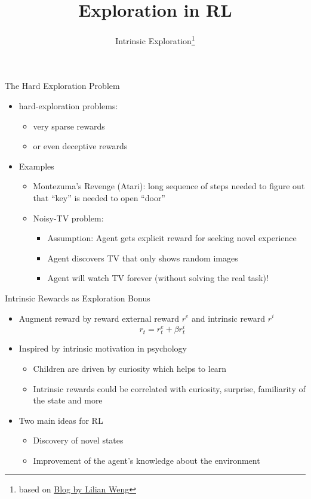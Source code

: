 \documentclass[aspectratio=169]{../latex_main/tntbeamer}  %
\title[RL: Exploration]{Exploration in RL}
\subtitle{Intrinsic Exploration\footnote{based on \href{https://lilianweng.github.io/lil-log/2020/06/07/exploration-strategies-in-deep-reinforcement-learning.html}{Blog by Lilian Weng}}}
\begin{document}
	
	\maketitle

\begin{frame}[c]{The Hard Exploration Problem}
	
	\begin{itemize}
		\item hard-exploration problems:
		\begin{itemize}
			\item very sparse rewards 
			\item or even deceptive rewards
		\end{itemize}
		\medskip
		\pause
		\item Examples
		\begin{itemize}
			\item Montezuma's Revenge (Atari): long sequence of steps needed to figure out that ``key'' is needed to open ``door''
			\item Noisy-TV problem: 
			\begin{itemize}
				\item Assumption: Agent gets explicit reward for seeking novel experience
				\item Agent discovers TV that only shows random images
				\item Agent will watch TV forever (without solving the real task)!
			\end{itemize}
		\end{itemize}
	\end{itemize}

\end{frame}
\begin{frame}[c]{Intrinsic Rewards as Exploration Bonus}
	
	\begin{itemize}
		\item Augment reward by reward external reward $r^e$ and intrinsic reward $r^i$
		$$r_t = r^e_t + \beta r_t^i $$
		\item Inspired by intrinsic motivation in psychology
		\begin{itemize}
			\item Children are driven by curiosity which helps to learn
			\item Intrinsic rewards could be correlated with curiosity, surprise, familiarity of the state and more
		\end{itemize}
		\item Two main ideas for RL
		\begin{itemize}
			\item Discovery of novel states
			\item Improvement of the agent's knowledge about the environment
		\end{itemize}
	\end{itemize}
	
\end{frame}
\end{document}
